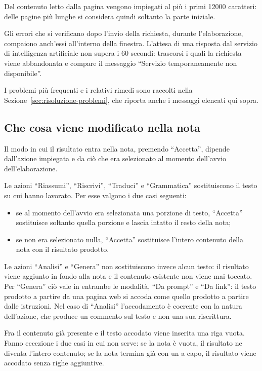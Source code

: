 \documentclass[a4paper, 10pt]{article}
\begin{document}
Del contenuto letto dalla pagina vengono impiegati al più i primi 12000 caratteri: delle pagine più lunghe si considera quindi soltanto la parte iniziale.

Gli errori che si verificano dopo l'invio della richiesta, durante l'elaborazione, compaiono anch'essi all'interno della finestra. L'attesa di una risposta dal servizio di intelligenza artificiale non supera i 60 secondi: trascorsi i quali la richiesta viene abbandonata e compare il messaggio ``Servizio temporaneamente non disponibile''.

I problemi più frequenti e i relativi rimedi sono raccolti nella Sezione~\ref{sec:risoluzione-problemi}, che riporta anche i messaggi elencati qui sopra.

\subsection{Che cosa viene modificato nella nota}
\label{sec:cosa-viene-modificato}
Il modo in cui il risultato entra nella nota, premendo ``Accetta'', dipende dall'azione impiegata e da ciò che era selezionato al momento dell'avvio dell'elaborazione.

Le azioni ``Riassumi'', ``Riscrivi'', ``Traduci'' e ``Grammatica'' sostituiscono il testo su cui hanno lavorato. Per esse valgono i due casi seguenti:

\begin{itemize}
    \item se al momento dell'avvio era selezionata una porzione di testo, ``Accetta'' sostituisce soltanto quella porzione e lascia intatto il resto della nota;

    \item se non era selezionato nulla, ``Accetta'' sostituisce l'intero contenuto della nota con il risultato prodotto.
\end{itemize}

Le azioni ``Analisi'' e ``Genera'' non sostituiscono invece alcun testo: il risultato viene aggiunto in fondo alla nota e il contenuto esistente non viene mai toccato. Per ``Genera'' ciò vale in entrambe le modalità, ``Da prompt'' e ``Da link'': il testo prodotto a partire da una pagina web si accoda come quello prodotto a partire dalle istruzioni. Nel caso di ``Analisi'' l'accodamento è coerente con la natura dell'azione, che produce un commento sul testo e non una sua riscrittura.

Fra il contenuto già presente e il testo accodato viene inserita una riga vuota. Fanno eccezione i due casi in cui non serve: se la nota è vuota, il risultato ne diventa l'intero contenuto; se la nota termina già con un a capo, il risultato viene accodato senza righe aggiuntive.
\end{document}
